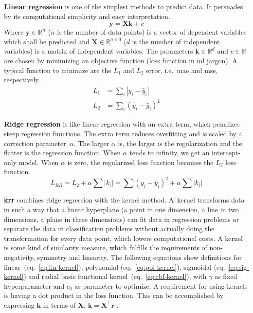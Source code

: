 %
\textbf{Linear regression} is one of the simplest methods to predict data. 
It persuades by its computational simplicity and easy interpretation. 
\begin{equation}
\mathbf{y} = \mathbf{X} \mathbf{k} +c 
\end{equation}
Where $\mathbf{y} \in \mathbb{R}^n$ ($n$ is the number of data points) is a vector of dependent variables which shall be predicted and $\mathbf{X}\in \mathbb{R}^{n\times d}$ ($d$ is the number of independent variables) is a matrix of independent variables. 
The parameters $\mathbf{k} \in \mathbb{R}^d$ and $c \in \mathbb{R}$ are chosen by minimizing an objective function (loss function in \gls{ml} jargon).
A typical function to minimize are the $L_1$ and $L_2$ error, i.e.\ \gls{mae} and \gls{mse}, respectively.
\begin{align}
L_1&= \sum_i |y_i - \hat y_i| \\%
L_2&= \sum_i(y_i - \hat y_i)^2 %
\end{align}
%

\textbf{Ridge regression} is like linear regression with an extra term, which penalizes steep regression functions.
The extra term reduces overfitting and is scaled by a correction parameter~$\alpha$. 
The larger $\alpha$ is, the larger is the regularization and the flatter is the regression function. 
When $\alpha$ tends to infinity, we get an intercept-only model.
When $\alpha$ is zero, the regularized loss function becomes the $L_2$ loss function.
\begin{equation}
    L_{RR} = L_2 + \alpha \sum |k_i| = \sum(y_i - \hat y_i)^2 + \alpha \sum |k_i| 
\end{equation}

\textbf{\Gls{krr}} combines ridge regression with the kernel method. 
A~kernel transforms data in such a way that a linear hyperplane (a point in one dimension, a line in two dimensions, 
a plane in three dimensions) can fit data in regression problems or separate the data in classification problems without actually doing the transformation for every data point, which lowers computational costs.
A kernel is some kind of similarity measure, which fulfills the requirements of non-negativity, symmetry and linearity\cite{rupp2015machine}.
The following equations show definitions for 
linear~(eq.~\ref{eq:lin-kernel}), 
polynomial (eq.~\ref{eq:pol-kernel}), 
sigmoidal (eq.~\ref{eq:sig-kernel}) and 
radial basis functional kernel~(eq.~\ref{eq:rbf-kernel}), with $\gamma$ as fixed hyperparameter and $c_0$ as parameter to optimize.
A requirement for using kernels is having a dot product in the loss function. 
This can be accomplished by expressing $\mathbf{k}$ in terms of $\mathbf{X}$: $\mathbf{k}=\mathbf{X}^\top \mathbf{r}$
\cite{rudin2020least}.

